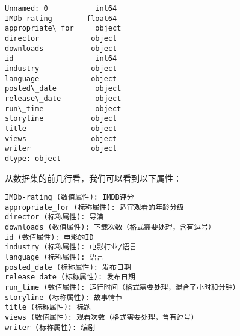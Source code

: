 \documentclass[11pt]{article}
\makeatletter
\newcommand{\boxspacing}{\kern\kvtcb@left@rule\kern\kvtcb@boxsep}
\newcommand{\prompt}[4]{
        {\ttfamily\llap{{\color{#2}[#3]:\hspace{3pt}#4}}\vspace{-\baselineskip}}
    }
\makeatother
\begin{document}
            \begin{tcolorbox}[breakable, size=fbox, boxrule=.5pt, pad at break*=1mm, opacityfill=0]
\prompt{Out}{outcolor}{17}{\boxspacing}
\begin{Verbatim}[commandchars=\\\{\}]
Unnamed: 0           int64
IMDb-rating        float64
appropriate\_for     object
director            object
downloads           object
id                   int64
industry            object
language            object
posted\_date         object
release\_date        object
run\_time            object
storyline           object
title               object
views               object
writer              object
dtype: object
\end{Verbatim}
\end{tcolorbox}
        
    从数据集的前几行看，我们可以看到以下属性：

\begin{verbatim}
IMDb-rating (数值属性): IMDB评分
appropriate_for (标称属性): 适宜观看的年龄分级
director (标称属性): 导演
downloads (数值属性): 下载次数（格式需要处理，含有逗号）
id (数值属性): 电影的ID
industry (标称属性): 电影行业/语言
language (标称属性): 语言
posted_date (标称属性): 发布日期
release_date (标称属性): 发布日期
run_time (数值属性): 运行时间（格式需要处理，混合了小时和分钟）
storyline (标称属性): 故事情节
title (标称属性): 标题
views (数值属性): 观看次数（格式需要处理，含有逗号）
writer (标称属性): 编剧
\end{verbatim}
\end{document}
